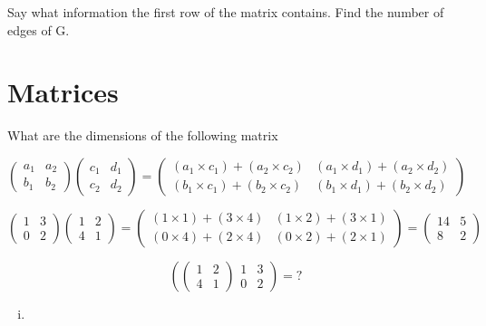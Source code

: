 \begin{itemize}
Say what information the first row of the matrix contains.
Find the number of edges of G.





\section{Matrices}

What are the dimensions of the following matrix


\[ \left(
\begin{array}{cc}
a_1 & a_2 \\ 
b_1 & b_2
\end{array} \right)\left(
\begin{array}{cc}
c_1 & d_1 \\ 
c_2 & d_2
\end{array} \right) = \left(
\begin{array}{cc}
(a_1 \times c_1) + (a_2 \times c_2) & (a_1 \times d_1) + (a_2 \times d_2) \\ 
(b_1 \times c_1) + (b_2 \times c_2) & (b_1 \times d_1) + (b_2 \times d_2)
\end{array} \right) \]

\bigskip
\large{
\[ \left(
\begin{array}{cc}
1 & 3 \\ 
0 & 2
\end{array} \right)\left(
\begin{array}{cc}
1 & 2 \\ 
4 & 1
\end{array} \right) = \left(
\begin{array}{cc}
(1 \times 1) + (3 \times 4) & (1 \times 2) + (3 \times 1) \\ 
(0 \times 4) + (2 \times 4) & (0 \times 2) + (2 \times 1)
\end{array} \right) = \left(
\begin{array}{cc}
14 & 5 \\ 
8 & 2
\end{array} \right) \]
}

\[ \left(
\left(
\begin{array}{cc}
1 & 2 \\ 
4 & 1
\end{array} \right)
\begin{array}{cc}
1 & 3 \\ 
0 & 2
\end{array} \right) = ? \]


\begin{enumerate}[(i)]
\item
\end{enumerate}


\end{itemize}
